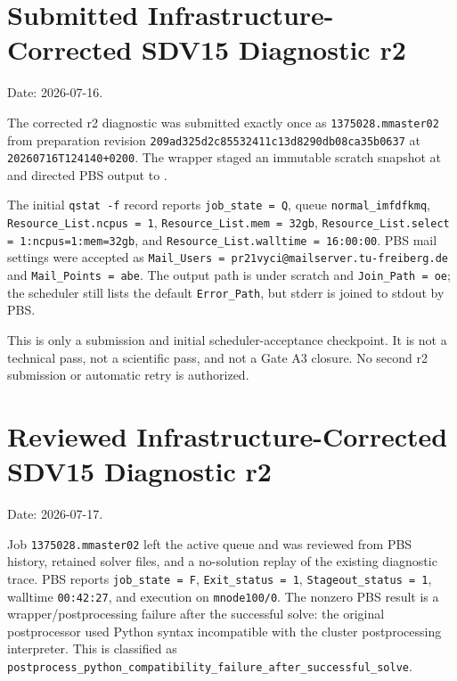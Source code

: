 \documentclass[11pt,a4paper]{article}
\begin{document}
\section{Submitted Infrastructure-Corrected SDV15 Diagnostic r2}

Date: 2026-07-16.

The corrected r2 diagnostic was submitted exactly once as \texttt{1375028.mmaster02} from preparation revision \texttt{209ad325d2c85532411c13d8290db08ca35b0637} at \texttt{20260716T124140+0200}. The wrapper staged an immutable scratch snapshot at  and directed PBS output to .

The initial \texttt{qstat -f} record reports \texttt{job\_state = Q}, queue \texttt{normal\_imfdfkmq}, \texttt{Resource\_List.ncpus = 1}, \texttt{Resource\_List.mem = 32gb}, \texttt{Resource\_List.select = 1:ncpus=1:mem=32gb}, and \texttt{Resource\_List.walltime = 16:00:00}. PBS mail settings were accepted as \texttt{Mail\_Users = pr21vyci@mailserver.tu-freiberg.de} and \texttt{Mail\_Points = abe}. The output path is under scratch and \texttt{Join\_Path = oe}; the scheduler still lists the default \texttt{Error\_Path}, but stderr is joined to stdout by PBS.

This is only a submission and initial scheduler-acceptance checkpoint. It is not a technical pass, not a scientific pass, and not a Gate A3 closure. No second r2 submission or automatic retry is authorized.

\section{Reviewed Infrastructure-Corrected SDV15 Diagnostic r2}

Date: 2026-07-17.

Job \texttt{1375028.mmaster02} left the active queue and was reviewed from PBS
history, retained solver files, and a no-solution replay of the existing
diagnostic trace. PBS reports \texttt{job\_state = F},
\texttt{Exit\_status = 1}, \texttt{Stageout\_status = 1}, walltime
\texttt{00:42:27}, and execution on \texttt{mnode100/0}. The nonzero PBS result
is a wrapper/postprocessing failure after the successful solve: the original
postprocessor used Python syntax incompatible with the cluster postprocessing
interpreter. This is classified as
\texttt{postprocess\_python\_compatibility\_failure\_after\_successful\_solve}.
\end{document}
